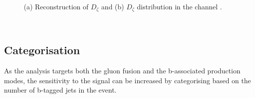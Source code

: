 \begin{figure}[h!]
\begin{center}
\end{center}
\caption[Reconstruction of the $D_{\zeta}$ variable and the $D_{\zeta}$ distribution
in the \emu channel.]{(a) Reconstruction of $D_{\zeta}$ \cite{cdf-dzeta} and (b) $D_{\zeta}$ distribution in the 
\emu channel \cite{CMS-PAS-HIG-16-037}.}
\label{fig:mssm_dzeta}
\end{figure}
~\clearpage
\subsection{Categorisation}
\label{sec:mssm_eventsel_categories}
As the analysis targets both the gluon fusion
and the b-associated production modes, 
the sensitivity to the signal can be increased by categorising
based on the number of b-tagged jets in the event.

